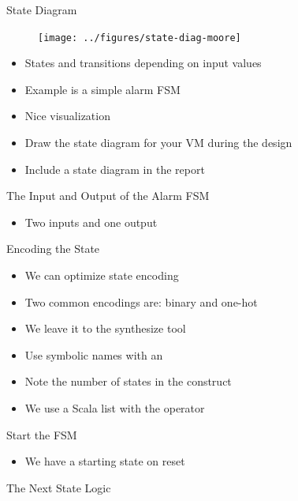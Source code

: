 \begin{frame}[fragile]{State Diagram}
\begin{figure}
  \texttt{[image: ../figures/state-diag-moore]}
\end{figure}
\begin{itemize}
\item States and transitions depending on input values
\item Example is a simple alarm FSM
\item Nice visualization
\item Draw the state diagram for your VM during the design
\item Include a state diagram in the report
\end{itemize}
\end{frame}



\begin{frame}[fragile]{The Input and Output of the Alarm FSM}
\begin{itemize}
\item Two inputs and one output
\end{itemize}
\end{frame}

\begin{frame}[fragile]{Encoding the State}
\begin{itemize}
\item We can optimize state encoding
\item Two common encodings are: binary and one-hot
\item We leave it to the synthesize tool
\item Use symbolic names with an 
\item Note the number of states in the  construct
\item We use a Scala list with the \code{::} operator
\end{itemize}
\end{frame}

\begin{frame}[fragile]{Start the FSM}
\begin{itemize}
\item We have a starting state on reset
\end{itemize}
\end{frame}


\begin{frame}[fragile]{The Next State Logic}
\end{frame}

